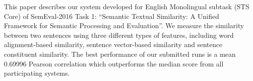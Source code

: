This paper describes our system developed for English Monolingual subtask (STS Core) of SemEval-2016 Task 1: ``Semantic Textual Similarity: A Unified Framework for Semantic Processing and Evaluation''. We measure the similarity between two sentences using three different types of features, including word alignment-based similarity, sentence vector-based similarity and sentence constituent similarity. The best performance of our submitted runs is a mean 0.69996 Pearson correlation which outperforms the median score from all participating systems.
